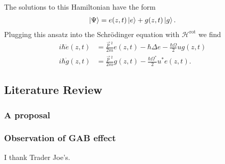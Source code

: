 \documentclass[reprint,
nofootinbib,
amsmath,amssymb,
aps]{revtex4-1}
\newcommand{\f}[2]{\frac{#1}{#2}}
\begin{document}
The solutions to this Hamiltonian have the form 
\begin{align*}
\ket{\Psi} = e(z,t)\ket{e} + g(z,t)\ket{g}.
\end{align*} 
Plugging this ansatz into the Schr\"{o}dinger equation with $\mathcal{H}^\text{rot}$ we find 
\begin{align*}
i\hbar \dot{e}(z,t) &= \f{\vec{p}\,^2}{2m} e(z,t) - \hbar \Delta e - \f{\hbar\Omega}{2}ug(z,t)\\
i\hbar \dot{g}(z,t) &= \f{\vec{p}\,^2}{2m} g(z,t) - \f{\hbar\Omega^*}{2}u^*e(z,t).
\end{align*}








\subsection{Literature Review}


\subsubsection{A proposal}


\subsubsection{Observation of GAB effect}





\begin{acknowledgments}
	I thank Trader Joe's. \cite{berry1984quantal}
\end{acknowledgments}



\end{document}
